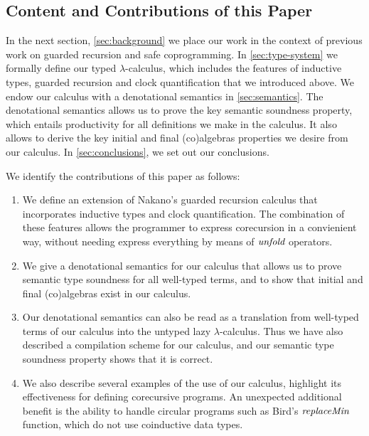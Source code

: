 \subsection{Content and Contributions of this Paper}

In the next section, \autoref{sec:background} we place our work in the
context of previous work on guarded recursion and safe
coprogramming. In \autoref{sec:type-system} we formally define our
typed $\lambda$-calculus, which includes the features of inductive
types, guarded recursion and clock quantification that we introduced
above. We endow our calculus with a denotational semantics in
\autoref{sec:semantics}.  The denotational semantics allows us to
prove the key semantic soundness property, which entails productivity
for all definitions we make in the calculus. It also allows to derive
the key initial and final (co)algebras properties we desire from our
calculus. In \autoref{sec:conclusions}, we set out our conclusions.

We identify the contributions of this paper as follows:
\begin{enumerate}
\item We define an extension of Nakano's guarded recursion calculus
  that incorporates inductive types and clock quantification. The
  combination of these features allows the programmer to express
  corecursion in a convienient way, without needing express everything
  by means of $\textit{unfold}$ operators.
\item We give a denotational semantics for our calculus that allows us
  to prove semantic type soundness for all well-typed terms, and to
  show that initial and final (co)algebras exist in our calculus.
\item Our denotational semantics can also be read as a translation
  from well-typed terms of our calculus into the untyped lazy
  $\lambda$-calculus. Thus we have also described a compilation scheme
  for our calculus, and our semantic type soundness property shows
  that it is correct.
\item We also describe several examples of the use of our calculus,
  highlight its effectiveness for defining corecursive programs. An
  unexpected additional benefit is the ability to handle circular
  programs such as Bird's $\textit{replaceMin}$ function, which do not
  use coinductive data types.
\end{enumerate}

